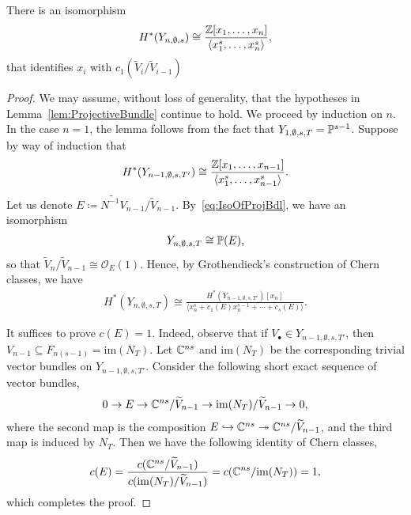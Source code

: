 \documentclass[12pt]{amsart}
\newcommand{\im}{\mathrm{im}}
\begin{document}
\begin{lemma}\label{lem:CohEmptyPartition}
There is an isomorphism
\begin{align}
H^*(Y_{n,\emptyset,s})\cong \frac{\mathbb{Z}[x_1,\dots, x_n]}{\langle x_1^s,\dots, x_n^s\rangle},
\end{align}
that identifies $x_i$ with $c_1(\widetilde V_i/\widetilde V_{i-1})$
\end{lemma}

\begin{proof}
We may assume, without loss of generality, that the hypotheses in Lemma~\ref{lem:ProjectiveBundle} continue to hold. We proceed by induction on $n$. In the case $n=1$, the lemma follows from the fact that $Y_{1,\emptyset,s,T} = \mathbb{P}^{s-1}$.
Suppose by way of induction that 
\begin{align}
H^*(Y_{n-1,\emptyset,s,T'}) \cong \frac{\mathbb{Z}[x_1,\dots, x_{n-1}]}{\langle x_1^s,\dots, x_{n-1}^s\rangle}.
\end{align}
Let us denote $E \coloneqq \widetilde{N^{-1}V}_{n-1}/\widetilde V_{n-1}$.
By~\eqref{eq:IsoOfProjBdl}, we have an isomorphism
\begin{align}
Y_{n,\emptyset,s,T} \cong \mathbb{P}(E),
\end{align}
so that $\widetilde V_n/\widetilde V_{n-1} \cong \mathcal{O}_E(1)$.
Hence, by Grothendieck's construction of Chern classes, we have
\begin{align}
H^*(Y_{n,\emptyset,s,T}) \cong \frac{H^*(Y_{n-1,\emptyset,s,T'})[x_n]}{\langle x_n^s + c_1(E)x_n^{s-1} + \cdots + c_s(E)\rangle}.
\end{align}

It suffices to prove $c(E) = 1$.
Indeed, observe that if $V_\bullet\in Y_{n-1,\emptyset,s,T'}$, then $V_{n-1}\subseteq F_{n(s-1)} = \im(N_T)$. Let $\mathbb{C}^{ns}$ and $\im(N_T)$ be the corresponding trivial vector bundles on $Y_{n-1,\emptyset,s,T'}$. Consider the following short exact sequence of vector bundles,
\begin{align}
0 \to E\to \bC^{ns}/\widetilde V_{n-1}\to \im(N_T)/\widetilde V_{n-1} \to 0,
\end{align}
where the second map is the composition $E\hookrightarrow \mathbb{C}^{ns} \twoheadrightarrow \mathbb{C}^{ns}/\widetilde V_{n-1}$, and the third map is induced by $N_T$.
Then we have the following identity of Chern classes,
\begin{align}
c(E) = \frac{c(\bC^{ns}/\widetilde V_{n-1})}{c(\im(N_T)/\widetilde V_{n-1})} = c(\bC^{ns}/\im(N_T)) = 1,
\end{align}
which completes the proof.
\end{proof}
\end{document}
